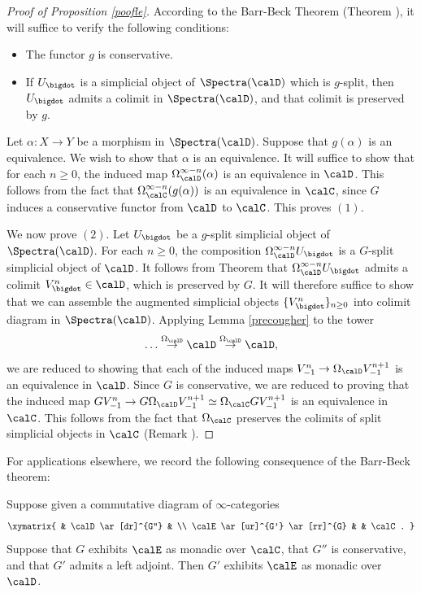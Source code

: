 \begin{proof}[Proof of Proposition \ref{poofle}]
According to the Barr-Beck Theorem (Theorem ), it will suffice to verify the following conditions:
\begin{itemize}
\item[$(1)$] The functor $g$ is conservative.
\item[$(2)$] If $U_{\bigdot}$ is a simplicial object of $\Spectra(\calD)$ which is $g$-split, then
$U_{\bigdot}$ admits a colimit in $\Spectra(\calD)$, and that colimit is preserved by $g$.
\end{itemize} 

Let $\alpha: X \rightarrow Y$ be a morphism in $\Spectra(\calD)$. Suppose that $g(\alpha)$ is an
equivalence. We wish to show that $\alpha$ is an equivalence. It will suffice to show that for
each $n \geq 0$, the induced map $\Omega^{\infty-n}_{\calD}(\alpha)$ is an equivalence in
$\calD$. This follows from the fact that $\Omega^{\infty-n}_{\calC}( g(\alpha) )$ is
an equivalence in $\calC$, since $G$ induces a conservative functor from
$\calD$ to $\calC$. This proves $(1)$.

We now prove $(2)$. Let $U_{\bigdot}$ be a $g$-split simplicial object of $\Spectra(\calD)$.
For each $n \geq 0$, the composition $\Omega^{\infty-n}_{\calD} U_{\bigdot}$ is a $G$-split
simplicial object of $\calD$. It follows from Theorem  that
$\Omega^{\infty-n}_{\calD} U_{\bigdot}$ admits a colimit $V^{n}_{\bigdot} \in \calD$, which is preserved by $G$. It will therefore suffice to show that we can assemble the augmented simplicial objects
$\{ V^{n}_{\bigdot} \}_{n \geq 0}$ into colimit diagram in $\Spectra(\calD)$. 
Applying Lemma \ref{precougher} to the tower
$$ \ldots \stackrel{ \Omega_{\calD} }{\rightarrow} \calD \stackrel{ \Omega_{\calD} }{\rightarrow} \calD,$$
we are reduced to showing that each of the induced maps
$V^{n}_{-1} \rightarrow \Omega_{\calD} V^{n+1}_{-1}$ is an equivalence in $\calD$. 
Since $G$ is conservative, we are reduced to proving that the induced map
$GV^{n}_{-1} \rightarrow G\Omega_{\calD} V^{n+1}_{-1} \simeq \Omega_{\calC} G V^{n+1}_{-1}$
is an equivalence in $\calC$. This follows from the fact that $\Omega_{\calC}$ preserves the colimits
of split simplicial objects in $\calC$ (Remark ). 
\end{proof}

For applications elsewhere, we record the following consequence of the Barr-Beck theorem:

\begin{proposition}\label{cuppp}
Suppose given a commutative diagram of $\infty$-categories
$$ \xymatrix{ & \calD \ar[dr]^{G''} & \\
\calE \ar[ur]^{G'} \ar[rr]^{G} & & \calC. }$$
Suppose that $G$ exhibits $\calE$ as monadic over $\calC$, that $G''$ is conservative, and that
$G'$ admits a left adjoint. Then $G'$ exhibits $\calE$ as monadic over $\calD$.
\end{proposition}

